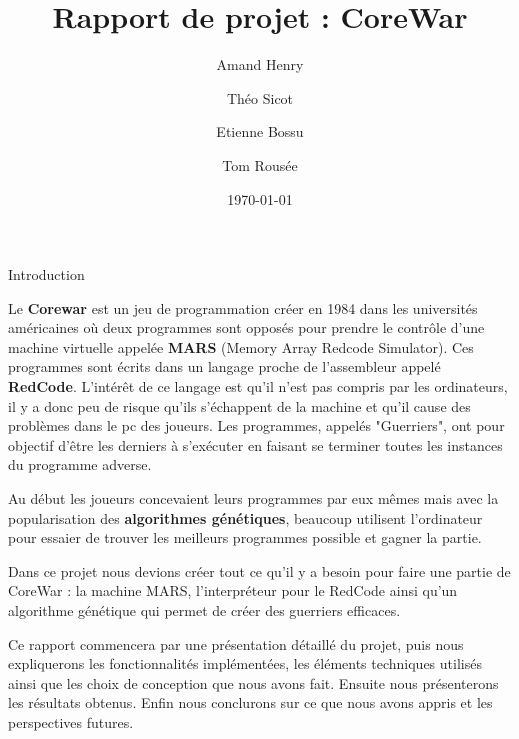 \documentclass[a4paper, 10pt]{article}
\title{Rapport de projet : CoreWar}
\author{Amand Henry\and{}Théo Sicot\and{}Etienne Bossu\and{}Tom Rousée}
\date{\today{}}
\begin{document}
    \maketitle{}
    \newpage{}
    \tableofcontents{}
    \newpage{}

    \begin{section}{Introduction} \label{sec:introduction}
        \par
            Le \textbf{Corewar} est un jeu de programmation créer en 1984 dans les universités américaines où deux programmes sont opposés pour prendre le contrôle d'une machine virtuelle appelée \textbf{MARS} (Memory Array Redcode Simulator). Ces programmes sont écrits dans un langage proche de l'assembleur appelé \textbf{RedCode}. L'intérêt de ce langage est qu'il n'est pas compris par les ordinateurs, il y a donc peu de risque qu'ils s'échappent de la machine et qu'il cause des problèmes dans le pc des joueurs. Les programmes, appelés "Guerriers", ont pour objectif d'être les derniers à s'exécuter en faisant se terminer toutes les instances du programme adverse.
            \bigskip
        \par
            Au début les joueurs concevaient leurs programmes par eux mêmes mais avec la popularisation des \textbf{algorithmes génétiques}, beaucoup utilisent l'ordinateur pour essaier de trouver les meilleurs programmes possible et gagner la partie.
            \bigskip
        \par
            Dans ce projet nous devions créer tout ce qu'il y a besoin pour faire une partie de CoreWar : la machine MARS, l'interpréteur pour le RedCode ainsi qu'un algorithme génétique qui permet de créer des guerriers efficaces. 
            \bigskip
        \par
            Ce rapport commencera par une présentation détaillé du projet, puis nous expliquerons les fonctionnalités implémentées, les éléments techniques utilisés ainsi que les choix de conception que nous avons fait. Ensuite nous présenterons les résultats obtenus. Enfin nous conclurons sur ce que nous avons appris et les perspectives futures.
    \end{section}
\end{document}
